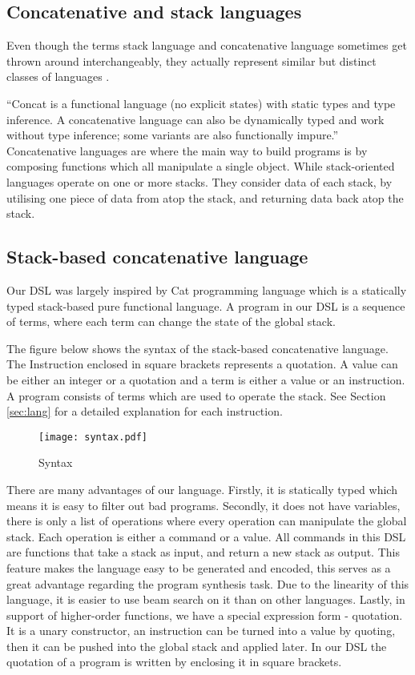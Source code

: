\subsection{Concatenative and stack languages}
Even though the terms stack language and concatenative language sometimes get thrown around interchangeably, they actually represent similar but distinct classes of languages \cite{concat}.

``Concat is a functional language (no explicit
states) with static types and type inference. A
concatenative language can also be dynamically
typed and work without type inference; some variants are also functionally impure.'' \cite{herzberg2009concatenative} Concatenative languages are where the main way to build programs is by composing functions which all manipulate a single object. While stack-oriented languages operate on one or more stacks. They consider data of each stack, by utilising one piece of data from atop the stack, and returning data back atop the stack. 

\subsection{Stack-based concatenative language}
\label{sec:stack-based catlang}
Our DSL was largely inspired by Cat programming language \cite{cat} which is a statically typed stack-based pure functional language. A program in our DSL is a sequence of terms, where each term can change the state of the global stack. 

The figure below shows the syntax of the stack-based concatenative language. The Instruction enclosed in square brackets represents a quotation. A value can be either an integer or a quotation and a term is either a value or an instruction. A program consists of terms which are used to operate the stack. See Section \ref{sec:lang} for a detailed explanation for each instruction.
\begin{figure}[H]
    \centering
    \texttt{[image: syntax.pdf]}
    \caption{Syntax}
    \label{fig:syntax}
\end{figure}

There are many advantages of our language. Firstly, it is statically typed which means it is easy to filter out bad programs. Secondly, it does not have variables, there is only a list of operations where every operation can manipulate the global stack. Each operation is either a command or a value. All commands in this DSL are functions that take a stack as input, and return a new stack as output. This feature makes the language easy to be generated and encoded, this serves as a great advantage regarding the program synthesis task. Due to the linearity of this language, it is easier to use beam search on it than on other languages. Lastly, in support of higher-order functions, we have a special expression form - quotation. It is a unary constructor, an instruction can be turned into a value by quoting, then it can be pushed into the global stack and applied later. In our DSL the quotation of a program is written by enclosing it in square brackets.

